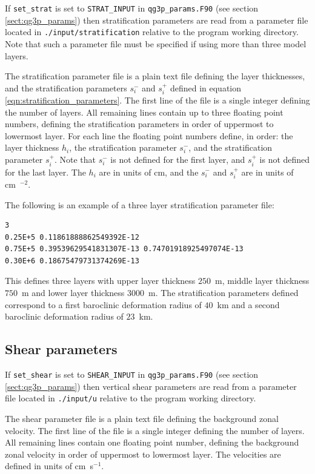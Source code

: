 \documentclass[a4paper]{book}
\begin{document}
If \verb+set_strat+ is set to \verb+STRAT_INPUT+ in \verb+qg3p_params.F90+ (see
section \ref{sect:qg3p_params}) then stratification parameters are read from
a parameter file located in \linebreak \verb+./input/stratification+ relative
to the program working directory. Note that such a parameter file must be
specified if using more than three model layers.

The stratification parameter file is a plain text file defining the layer
thicknesses, and the stratification parameters $s_i^-$ and $s_i^+$ defined
in equation \eqref{eqn:stratification_parameters}. The first line of the
file is a single integer defining the number of layers. All remaining lines
contain up to three floating point numbers, defining the stratification
parameters in order of uppermost to lowermost layer. For each line the
floating point numbers define, in order: the layer thickness $h_i$, the
stratification parameter $s_i^-$, and the stratification parameter $s_i^+$.
Note that $s_i^-$ is not defined for the first layer, and $s_i^+$ is not defined
for the last layer. The $h_i$ are in units of cm, and the $s_i^-$ and $s_i^+$
are in units of cm~$^{-2}$.

The following is an example of a three layer stratification parameter file:
\begin{lstlisting}[language = sh, frame = single]
3
0.25E+5 0.11861888862549392E-12
0.75E+5 0.39539629541831307E-13 0.74701918925497074E-13
0.30E+6 0.18675479731374269E-13
\end{lstlisting}
This defines three layers with upper layer thickness $250$~m, middle layer
thickness $750$~m and lower layer thickness $3000$~m. The stratification
parameters defined correspond to a first baroclinic deformation radius of
$40$~km and a second baroclinic deformation radius of $23$~km.

\subsection{Shear parameters}\label{sect:shear_input}

If \verb+set_shear+ is set to \verb+SHEAR_INPUT+ in \verb+qg3p_params.F90+ (see
section \ref{sect:qg3p_params}) then vertical shear parameters are read from
a parameter file located in \linebreak \verb+./input/u+ relative
to the program working directory.

The shear parameter file is a plain text file defining the background zonal
velocity. The first line of the
file is a single integer defining the number of layers. All remaining lines
contain one floating point number, defining the background zonal
velocity in order of uppermost to lowermost layer. The velocities are defined
in units of cm~s${}^{-1}$.
\end{document}
